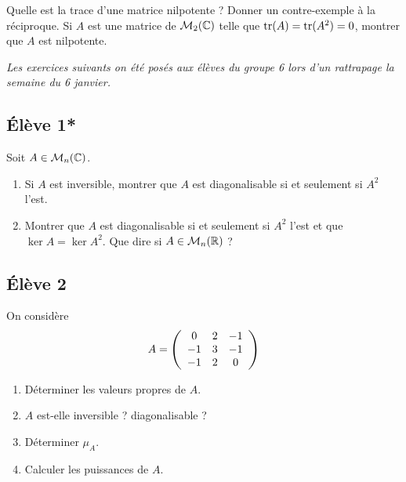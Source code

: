 \documentclass[10pt]{scrartcl}
\begin{document}
    \begin{exo}
        Quelle est la trace d'une matrice nilpotente ? 
        Donner un contre-exemple à la réciproque. 
        Si $A$ est une matrice de $\mathcal M_2(\operatorname{\mathbb C})$ 
        telle que $\operatorname{tr}(A)=\operatorname{tr}(A^2)=0$, montrer que $A$ 
        est nilpotente.
    \end{exo}

    \color{commented}\itshape 
    Les exercices suivants on été posés aux élèves du groupe 6 lors d'un rattrapage 
    la semaine du 6 janvier.
    \fontreset

    \subsection*{Élève 1*}
    \begin{exo}
        Soit $A\in\mathcal M_n(\operatorname{\mathbb C})$.
       \begin{enumerate}
        \item Si $A$ est inversible, montrer que $A$ 
        est diagonalisable si et seulement si $A^2$ l'est.
        \item Montrer que $A$ est diagonalisable si 
        et seulement si $A^2$ l'est et que $\ker A = \ker A^2$.
        Que dire si $A\in\mathcal M_n(\operatorname{\mathbb R})$ ?
       \end{enumerate}
    \end{exo}

    \subsection*{Élève 2}
    \begin{ccp}
        On considère 
        \[
            A=\left(\begin{array}{c c c}
                0 & 2 & -1\\
                -1 & 3 & -1\\
                -1 & 2 & 0
            \end{array}\right)
        \]
        \begin{enumerate}
            \item Déterminer les valeurs propres de $A$. 
            \item $A$ est-elle inversible ? diagonalisable ?
            \item Déterminer $\mu_A$.
            \item Calculer les puissances de $A$.
        \end{enumerate}
    \end{ccp}
\end{document}
